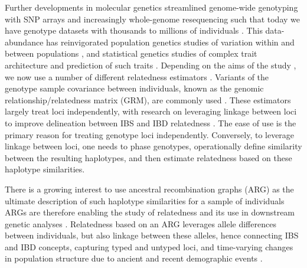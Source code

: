 \begin{tcolorbox}[breakable,pad at break*=1mm, colback=blue!5!white,colframe=blue!75!black,title=Box 1: A Brief History of Genetic Relatedness]

Further developments in molecular genetics streamlined genome-wide
genotyping with SNP arrays and increasingly whole-genome resequencing such
that today we have genotype datasets with thousands to millions of individuals
\citep[e.g.][]{turnbull2018hundred, bycroft2018genome, rosfreixedes2020accuracy}.
%
This data-abundance has reinvigorated population genetics studies of
variation within and between populations
\citep{begun2007population, langley2012genomic},
and statistical genetics studies of
complex trait architecture \citep{burton2007genome, abdellaoui202315} and
prediction of such traits \citep{meuwissen2001prediction, meuwissen2013accelerating}.
%
Depending on the aims of the study \citep{speed2015relatedness}, we now use
a number of different relatedness estimators
\citep[e.g.][]{vanraden2008efficient, yang2010common, manichaikul2010robust,
speed2012improved, weir2017unified, weir2018how, ochoa2021estimating, maryhuard2023fast}.
%
Variants of the genotype sample covariance between individuals,
known as the genomic relationship/relatedness matrix (GRM),
are commonly used \citep{vanraden2008efficient, yang2010common, speed2012improved}.
%
These estimators largely treat loci independently,
with research on leveraging linkage between loci to improve
delineation between IBS and IBD relatedness
\citep[e.g.][]{visscher2006assumption, browning2012identity, thompson2013identity,
hickey2013genomic, edwards2015two, pook2019haploblocker, saada2020identity}.
%
The ease of use is the primary reason for treating genotype loci independently.
%
Conversely, to leverage linkage between loci, one needs to phase genotypes, operationally
define similarity between the resulting haplotypes, and then estimate relatedness
based on these haplotype similarities.


There is a growing interest to use ancestral recombination graphs (ARG)
as the ultimate description of such haplotype similarities for a sample of individuals
%
ARGs are therefore enabling the study of relatedness and its use in downstream genetic analyses
\citep{fan2022genealogical, tsambos2022efficient, zhang2023biobank, link2023tree, schraiber2024unifying}.
%
Relatedness based on an ARG leverages allele differences between individuals,
but also linkage between these alleles, hence
connecting IBS and IBD concepts,
capturing typed and untyped loci, and
time-varying changes in population structure due to ancient and recent demographic events
\citep{fan2022genealogical, young2022discovering, zhang2023biobank, harris2023using}.

\end{tcolorbox}